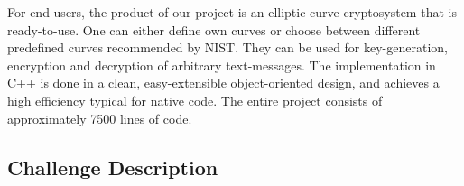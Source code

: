 \documentclass[11pt,english]{article}
\begin{document}
For end-users, the product of our project is an elliptic-curve-cryptosystem that is ready-to-use. One can either define own curves or choose between different predefined curves recommended by NIST. They can be used for key-generation, encryption and decryption of arbitrary text-messages. The implementation in C++ is done in a clean, easy-extensible object-oriented design, and achieves a high efficiency typical for native code. The entire project consists of approximately 7500 lines of code.

\begin{appendix}
\section{Challenge Description}
\label{appendixa}

\end{appendix}

\newpage


\end{document}
